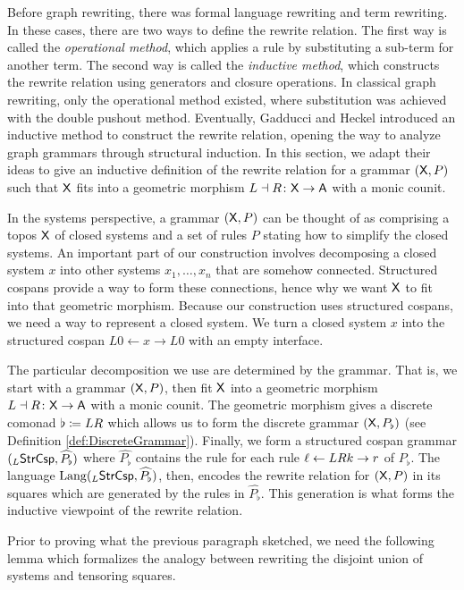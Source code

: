 \documentclass{amsart}
\begin{document}
Before graph rewriting, there was formal language rewriting
and term rewriting. In these cases, there are two ways to
define the rewrite relation.  The first way is called the
\emph{operational method}, which applies a rule by
substituting a sub-term for another term.  The second way is
called the \emph{inductive method}, which constructs the
rewrite relation using generators and closure operations. In
classical graph rewriting, only the operational method
existed, where substitution was achieved with the double
pushout method.  Eventually, Gadducci and Heckel introduced
an inductive method to construct the rewrite relation,
opening the way to analyze graph grammars through structural
induction. In this section, we adapt their ideas to give an
inductive definition of the rewrite relation for a grammar
$ ( \mathsf{X},P ) $ such that $\mathsf{X} $ fits into a geometric morphism
$L \dashv R \colon \mathsf{X} \to \mathsf{A} $ with a monic counit.

In the systems perspective, a grammar $( \mathsf{X},P )$ can be
thought of as comprising a topos $\mathsf{X}$ of closed systems and
a set of rules $P$ stating how to simplify the closed
systems. An important part of our construction involves
decomposing a closed system $x$ into other systems
$x_1, \dotsc, x_n$ that are somehow connected. Structured
cospans provide a way to form these connections, hence why
we want $\mathsf{X}$ to fit into that geometric morphism. Because
our construction uses structured cospans, we need a way to
represent a closed system. We turn a closed system $x$ into
the structured cospan $L0 \gets x \to L0$ with an empty interface.

The particular decomposition we use are determined by the
grammar. That is, we start with a grammar $( \mathsf{X},P )$, then
fit $\mathsf{X}$ into a geometric morphism
$L \dashv R \colon \mathsf{X} \to \mathsf{A}$ with a monic counit. The
geometric morphism gives a discrete comonad
$\flat \coloneqq LR$ which allows us to form the discrete
grammar $(\mathsf{X},P_\flat)$ (see Definition
\ref{def:DiscreteGrammar}). Finally, we form a structured
cospan grammar $ ( _L \mathsf{StrCsp} , \widehat{P_\flat} ) $ where
$ \hat{P_\flat} $ contains the rule
 for each rule
$ \ell \leftarrow LRk \to r $ of $ P_{\flat} $. The language $\mathrm{Lang}
( _L \mathsf{StrCsp} , \widehat{P_\flat} )$, then, encodes the rewrite
relation for $( \mathsf{X},P )$ in its squares which are generated
by the rules in $\hat{P_\flat}$. This generation is what
forms the inductive viewpoint of the rewrite relation. 

Prior to proving what the previous paragraph sketched, we
need the following lemma which formalizes the analogy
between rewriting the disjoint union of systems and
tensoring squares.
\end{document}
